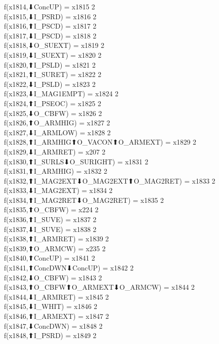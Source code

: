 f(x1814,⬇ConcUP) = x1815 {2} \\
f(x1815,⬇I_PSRD) = x1816 {2} \\
f(x1816,⬆I_PSCD) = x1817 {2} \\
f(x1817,⬇I_PSCD) = x1818 {2} \\
f(x1818,⬇O_SUEXT) = x1819 {2} \\
f(x1819,⬇I_SUEXT) = x1820 {2} \\
f(x1820,⬆I_PSLD) = x1821 {2} \\
f(x1821,⬆I_SURET) = x1822 {2} \\
f(x1822,⬇I_PSLD) = x1823 {2} \\
f(x1823,⬇I_MAG1EMPT) = x1824 {2} \\
f(x1824,⬆I_PSEOC) = x1825 {2} \\
f(x1825,⬇O_CBFW) = x1826 {2} \\
f(x1826,⬆O_ARMHIG) = x1827 {2} \\
f(x1827,⬇I_ARMLOW) = x1828 {2} \\
f(x1828,⬆I_ARMHIG⬆O_VACON⬆O_ARMEXT) = x1829 {2} \\
f(x1829,⬇I_ARMRET) = x207 {2} \\
f(x1830,⬆I_SURLS⬇O_SURIGHT) = x1831 {2} \\
f(x1831,⬆I_ARMHIG) = x1832 {2} \\
f(x1832,⬆I_MAG2EXT⬇O_MAG2EXT⬆O_MAG2RET) = x1833 {2} \\
f(x1833,⬇I_MAG2EXT) = x1834 {2} \\
f(x1834,⬆I_MAG2RET⬇O_MAG2RET) = x1835 {2} \\
f(x1835,⬆O_CBFW) = x224 {2} \\
f(x1836,⬆I_SUVE) = x1837 {2} \\
f(x1837,⬇I_SUVE) = x1838 {2} \\
f(x1838,⬆I_ARMRET) = x1839 {2} \\
f(x1839,⬆O_ARMCW) = x235 {2} \\
f(x1840,⬆ConcUP) = x1841 {2} \\
f(x1841,⬆ConcDWN⬇ConcUP) = x1842 {2} \\
f(x1842,⬇O_CBFW) = x1843 {2} \\
f(x1843,⬆O_CBFW⬆O_ARMEXT⬇O_ARMCW) = x1844 {2} \\
f(x1844,⬇I_ARMRET) = x1845 {2} \\
f(x1845,⬇I_WHIT) = x1846 {2} \\
f(x1846,⬆I_ARMEXT) = x1847 {2} \\
f(x1847,⬇ConcDWN) = x1848 {2} \\
f(x1848,⬆I_PSRD) = x1849 {2} \\
